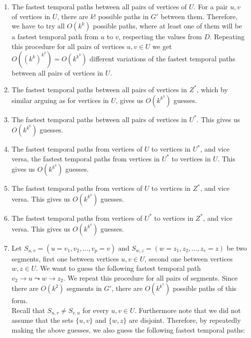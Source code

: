 \documentclass[a4paper,UKenglish,cleveref, autoref, thm-restate, anonymous]{lipics-v2021}
\newcommand{\deltaExact}{\textsc{Periodic TGR}}
\begin{document}
\begin{enumerate}[G-1.]
    \item \label{FPT-guessFTPamongU}
    The fastest temporal paths between all pairs of vertices of $U$.
    For a pair $u,v$ of vertices in $U$, there are $k!$ possible paths in $G'$ between them. 
    Therefore, we have to try all $O(k^k)$ possible paths, where at least one of them will be a fastest temporal path from $u$ to $v$, respecting the values from $D$.
    Repeating this procedure for all pairs of vertices $u,v \in U$ we get $O((k^k)^{k^2})=O(k^{k^3})$ different variations of the fastest temporal paths between all pairs of vertices in $U$.
    \item \label{FPT-guessFTPamongZstar}
    The fastest temporal paths between all pairs of vertices in $Z^*$, 
    which by similar arguing as for vertices in $U$, gives us $O(k^{k^3})$ guesses.
    \item \label{FPT-guessFTPamongUstar}
    The fastest temporal paths between all pairs of vertices in $U^*$.
    This gives us $O(k^{k^6})$ guesses.
    \item \label{FPT-guessFTPamongUandUstar}
    The fastest temporal paths from vertices of $U$ to vertices in $U^*$,
    and vice versa, the fastest temporal paths from vertices in $U^*$ to vertices in $U$.
    This gives us $O(k^{k^4})$ guesses.
    \item \label{FPT-guessFTPamongUandZstar}
    The fastest temporal paths from vertices of $U$ to vertices in $Z^*$,
    and vice versa.
    This gives us $O(k^{k^3})$ guesses.
    \item \label{FPT-guessFTPamongUstarandZstar}
    The fastest temporal paths from vertices of $U^*$ to vertices in $Z^*$,
    and vice versa.
    This gives us $O(k^{k^4})$ guesses.
    \item \label{FPT-guessFTPamongv2z2}
    Let $S_{u,v} = (u=v_1,v_2, \dots, v_p = v)$ and $S_{w,z} = (w=z_1,z_2, \dots, z_r = z)$ be two segments,
    first one between vertices $u,v \in U$, second one between vertices $w, z \in U$.
    We want to guess the following fastest temporal path
    $v_2 \rightarrow u \leadsto w \rightarrow z_2$. 
    We repeat this procedure for all pairs of segments.
    Since there are $O(k^2)$ segments in $G'$,
    there are $O(k^{k^5})$ possible paths of this form. \\
    Recall that $S_{u,v}\neq S_{v,u}$ for every $u,v\in U$. Furthermore note that we did not assume that the sets $\{u,v\}$ and $\{w,z\}$ are disjoint. Therefore, by repeatedly making the above guesses, we also guess the following fastest temporal paths: 

\end{enumerate}
\end{document}

